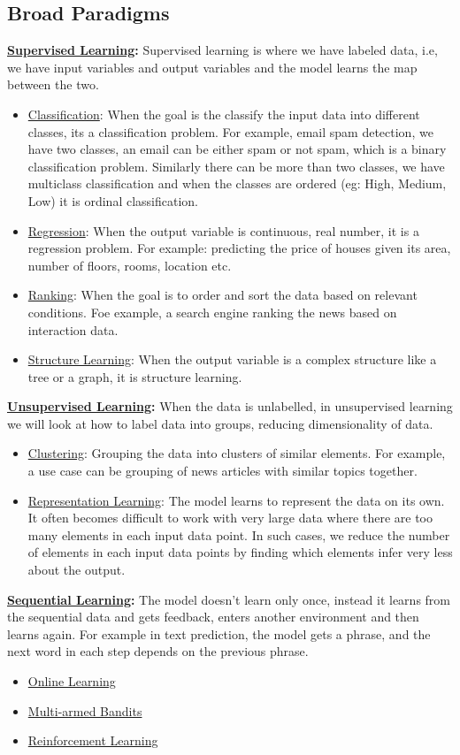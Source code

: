 \documentclass[12pt,a4paper]{article}
\begin{document}
\subsection{Broad Paradigms}
\textbf{\underline{Supervised Learning}:} Supervised learning is where we have labeled data, i.e, we have input variables and output variables and the model learns the map between the two.
\begin{itemize}
    \item \underline{Classification}: When the goal is the classify the input data into different classes, its a classification problem. For example, email spam detection, we have two classes, an email can be either spam or not spam, which is a binary classification problem. Similarly there can be more than two classes, we have multiclass classification and when the classes are ordered (eg: High, Medium, Low) it is ordinal classification.
    \item \underline{Regression}: When the output variable is continuous, real number, it is a regression problem. For example: predicting the price of houses given its area, number of floors, rooms, location etc.
    \item \underline{Ranking}: When the goal is to order and sort the data based on relevant conditions. Foe example, a search engine ranking the news based on interaction data.
    \item \underline{Structure Learning}: When the output variable is a complex structure like a tree or a graph, it is structure learning. 
\end{itemize}
\textbf{\underline{Unsupervised Learning}:} When the data is unlabelled, in unsupervised learning we will look at how to label data into groups, reducing dimensionality of data.
\begin{itemize}
    \item \underline{Clustering}: Grouping the data into clusters of similar elements. For example, a use case can be grouping of news articles with similar topics together.
    \item \underline{Representation Learning}: The model learns to represent the data on its own. It often becomes difficult to work with very large data where there are too many elements in each input data point. In such cases, we reduce the number of elements in each input data points by finding which elements infer very less about the output.
\end{itemize}
\textbf{\underline{Sequential Learning}:} The model doesn't learn only once, instead it learns from the sequential data and gets feedback, enters another environment and then learns again. For example in text prediction, the model gets a phrase, and the next word in each step depends on the previous phrase.
\begin{itemize}
    \item \underline{Online Learning}
    \item \underline{Multi-armed Bandits}
    \item \underline{Reinforcement Learning}
\end{itemize}
\end{document}

